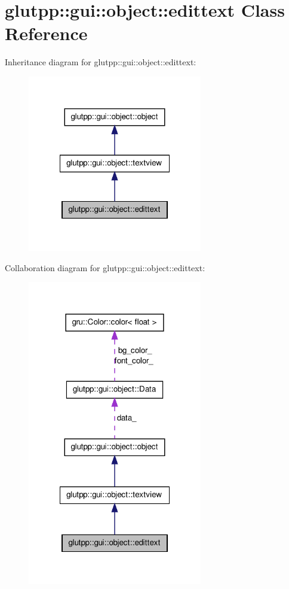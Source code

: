 \hypertarget{classglutpp_1_1gui_1_1object_1_1edittext}{\section{glutpp\-:\-:gui\-:\-:object\-:\-:edittext \-Class \-Reference}
\label{classglutpp_1_1gui_1_1object_1_1edittext}
}


\-Inheritance diagram for glutpp\-:\-:gui\-:\-:object\-:\-:edittext\-:\nopagebreak
\begin{figure}[H]
\begin{center}
\leavevmode
\includegraphics[width=216pt]{classglutpp_1_1gui_1_1object_1_1edittext__inherit__graph}
\end{center}
\end{figure}


\-Collaboration diagram for glutpp\-:\-:gui\-:\-:object\-:\-:edittext\-:\nopagebreak
\begin{figure}[H]
\begin{center}
\leavevmode
\includegraphics[width=216pt]{classglutpp_1_1gui_1_1object_1_1edittext__coll__graph}
\end{center}
\end{figure}

